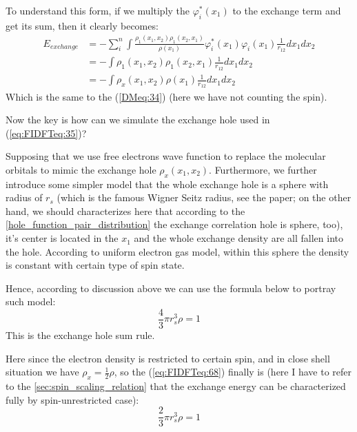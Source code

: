 To understand this form, if we multiply the $\varphi_{i}^{*}(x_{1})$
to the exchange term and get its sum, then it clearly becomes:
\begin{align}
  \label{eq:FIDFTeq:37}
  E_{exchange} &= -\sum_{i}^{n}\int
  \frac{\rho_{1}(x_{1},x_{2})\rho_{1}(x_{2},x_{1})}{\rho(x_{1})}
  \varphi_{i}^{*}(x_{1})\varphi_{i}(x_{1})\frac{1}{r_{12}}dx_{1}dx_{2}
  \nonumber \\
  &= -\int \rho_{1}(x_{1},x_{2})\rho_{1}(x_{2},x_{1})
  \frac{1}{r_{12}}dx_{1}dx_{2} \nonumber \\
  &= -\int \rho_{x}(x_{1},x_{2})\rho(x_{1})\frac{1}{r_{12}}dx_{1}dx_{2}
\end{align}
Which is the same to the (\ref{DMeq:34}) (here we have not counting
the spin).

Now the key is how can we simulate the exchange hole used in
(\ref{eq:FIDFTeq:35})? 

Supposing that we use free electrons wave function to replace the
molecular orbitals to mimic the exchange hole
$\rho_{x}(x_{1},x_{2})$. Furthermore, we further introduce some
simpler model that the whole exchange hole is a sphere with radius of
$r_{s}$ (which is the famous Wigner Seitz radius, see the
paper\cite{PhysRev.43.804, PhysRev.46.509}; on the other hand, we
should characterizes here that according to the
\ref{hole_function_pair_distribution} the exchange correlation hole is
sphere, too), it's center is located in the $x_{1}$ and the whole
exchange density are all fallen into the hole. According to uniform
electron gas model, within this sphere the density is constant with
certain type of spin state.

Hence, according to discussion above we can use the formula below
to portray such model:
\begin{equation}
  \label{eq:FIDFTeq:68}
  \frac{4}{3}\pi r_{s}^{3}\rho = 1
\end{equation}
This is the exchange hole sum rule.

Here since the electron density is restricted to certain spin, and in
close shell situation we have $\rho_{x} = \frac{1}{2}\rho$, so the
(\ref{eq:FIDFTeq:68}) finally is (here I have to refer to the
\ref{sec:spin_scaling_relation} that the exchange energy can be
characterized fully by spin-unrestricted case):
\begin{equation}
  \label{eq:FIDFTeq:69}
  \frac{2}{3}\pi r_{s}^{3}\rho = 1
\end{equation}

